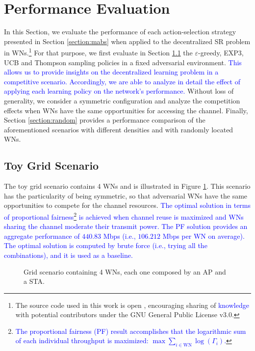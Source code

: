 \documentclass[preprint,12pt]{elsarticle}
\begin{document}
	\section{Performance Evaluation}
	\label{section:performance_evaluation}
	
	In this Section, we evaluate the performance of each action-selection strategy presented in Section \ref{section:mabs} when applied to the decentralized SR problem in WNs.\footnote{The source code used in this work is open \cite{fwilhelmi2017code}, encouraging sharing of \textcolor{blue}{knowledge} with potential contributors under the GNU General Public License v3.0.} For that purpose, we first evaluate in Section \ref{section:toy_grid_scenario} the $\varepsilon$-greedy, EXP3, UCB and Thompson sampling policies in a fixed adversarial environment. \textcolor{blue}{This allows us to provide insights on the decentralized learning problem in a competitive scenario. Accordingly, we are able to analyze in detail the effect of applying each learning policy on the network's performance.} Without loss of generality, we consider a symmetric configuration and analyze the competition effects when WNs have the same opportunities for accessing the channel. Finally, Section \ref{section:random} provides a performance comparison of the aforementioned scenarios with different densities and with randomly located WNs.	
	\subsection{Toy Grid Scenario}		
	\label{section:toy_grid_scenario}	
	
	The toy grid scenario contains 4 WNs and is illustrated in Figure \ref{fig:scenario}. This scenario has the particularity of being symmetric, so that adversarial WNs have the same opportunities to compete for the channel resources. \textcolor{blue}{The optimal solution in terms of proportional fairness\footnote{\textcolor{blue}{The proportional fairness (PF) result accomplishes that the logarithmic sum of each individual throughput is maximized: $\max \sum_{i \in \text{WN}} \log(\Gamma_i)$.}} is achieved when channel reuse is maximized and WNs sharing the channel moderate their transmit power. The PF solution provides an aggregate performance of $440.83$ Mbps (i.e., $106.212$ Mbps per WN on average). The optimal solution is computed by brute force (i.e., trying all the combinations), and it is used as a baseline.}
	
	\begin{figure}[h!]
		\centering								
		\caption{Grid scenario containing 4 WNs, each one composed by an AP and a STA.}
		\label{fig:scenario}
	\end{figure}
	
\end{document}
